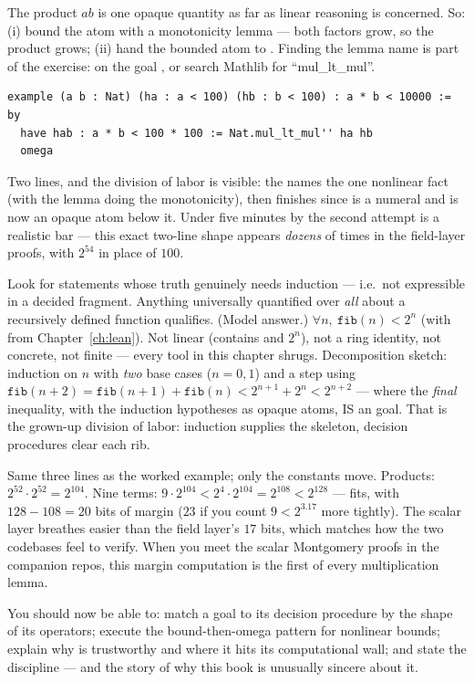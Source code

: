 \pathway The product $ab$ is one opaque quantity as far as linear
reasoning is concerned. So: (i) bound the atom with a monotonicity lemma
--- both factors grow, so the product grows; (ii) hand the bounded atom to
. Finding the lemma name is part of the exercise:
 on the goal , or search Mathlib for
``mul\_lt\_mul''.
\answer
\begin{lstlisting}[language=Lean]
example (a b : Nat) (ha : a < 100) (hb : b < 100) : a * b < 10000 := by
  have hab : a * b < 100 * 100 := Nat.mul_lt_mul'' ha hb
  omega
\end{lstlisting}
Two lines, and the division of labor is visible: the  names the
one nonlinear fact (with the lemma doing the monotonicity), then
 finishes since  is a numeral and 
is now an opaque atom below it. Under five minutes by the second attempt
is a realistic bar --- this exact two-line shape appears \emph{dozens} of
times in the field-layer proofs, with $2^{54}$ in place of $100$.

\pathway Look for statements whose truth genuinely needs induction ---
i.e.\ not expressible in a decided fragment. Anything universally
quantified over \emph{all}  about a recursively defined function
qualifies.
\answer (Model answer.) $\forall n,\ \mathtt{fib}(n) < 2^n$ (with
 from Chapter~\ref{ch:lean}). Not linear (contains 
and $2^n$), not a ring identity, not concrete, not finite --- every tool
in this chapter shrugs. Decomposition sketch: induction on $n$ with
\emph{two} base cases ($n = 0, 1$) and a step using
$\mathtt{fib}(n{+}2) = \mathtt{fib}(n{+}1) + \mathtt{fib}(n) <
2^{n+1} + 2^n < 2^{n+2}$ --- where the \emph{final} inequality, with the
induction hypotheses as opaque atoms, IS an  goal. That is the
grown-up division of labor: induction supplies the skeleton, decision
procedures clear each rib.

\pathway Same three lines as the worked example; only the constants move.
\answer Products: $2^{52} \cdot 2^{52} = 2^{104}$. Nine terms:
$9 \cdot 2^{104} < 2^4 \cdot 2^{104} = 2^{108} < 2^{128}$ --- fits, with
$128 - 108 = 20$ bits of margin ($23$ if you count $9 < 2^{3.17}$ more
tightly). The scalar layer breathes easier than the field layer's $17$
bits, which matches how the two codebases feel to verify. When you meet
the scalar Montgomery proofs in the companion repos, this margin
computation is the first  of every multiplication lemma.

\begin{checkpoint}
You should now be able to: match a goal to its decision procedure by the
shape of its operators; execute the bound-then-omega pattern for nonlinear
bounds; explain why  is trustworthy and where it hits its
computational wall; and state the  discipline --- and the story of
why this book is unusually sincere about it.
\end{checkpoint}
